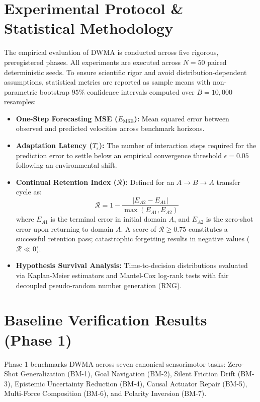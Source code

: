 \documentclass[preprint,12pt]{elsarticle}
\begin{document}
\section{Experimental Protocol \& Statistical Methodology}
\label{sec:methods}
The empirical evaluation of DWMA is conducted across five rigorous, preregistered phases. All experiments are executed across $N = 50$ paired deterministic seeds. To ensure scientific rigor and avoid distribution-dependent assumptions, statistical metrics are reported as sample means with non-parametric bootstrap $95\%$ confidence intervals computed over $B = 10,000$ resamples:
\begin{itemize}
    \item \textbf{One-Step Forecasting MSE ($E_{\text{MSE}}$):} Mean squared error between observed and predicted velocities across benchmark horizons.
    \item \textbf{Adaptation Latency ($T_\epsilon$):} The number of interaction steps required for the prediction error to settle below an empirical convergence threshold $\epsilon = 0.05$ following an environmental shift.
    \item \textbf{Continual Retention Index ($\mathcal{R}$):} Defined for an $A \to B \to A$ transfer cycle as:
    \begin{equation}
    \mathcal{R} = 1 - \frac{|E_{A2} - E_{A1}|}{\max(E_{A1}, E_{A2})}
    \end{equation}
    where $E_{A1}$ is the terminal error in initial domain $A$, and $E_{A2}$ is the zero-shot error upon returning to domain $A$. A score of $\mathcal{R} \ge 0.75$ constitutes a successful retention pass; catastrophic forgetting results in negative values ($\mathcal{R} \ll 0$).
    \item \textbf{Hypothesis Survival Analysis:} Time-to-decision distributions evaluated via Kaplan-Meier estimators and Mantel-Cox log-rank tests with fair decoupled pseudo-random number generation (RNG).
\end{itemize}

\section{Baseline Verification Results (Phase 1)}
\label{sec:phase1}
Phase 1 benchmarks DWMA across seven canonical sensorimotor tasks: Zero-Shot Generalization (BM-1), Goal Navigation (BM-2), Silent Friction Drift (BM-3), Epistemic Uncertainty Reduction (BM-4), Causal Actuator Repair (BM-5), Multi-Force Composition (BM-6), and Polarity Inversion (BM-7). 
\end{document}
